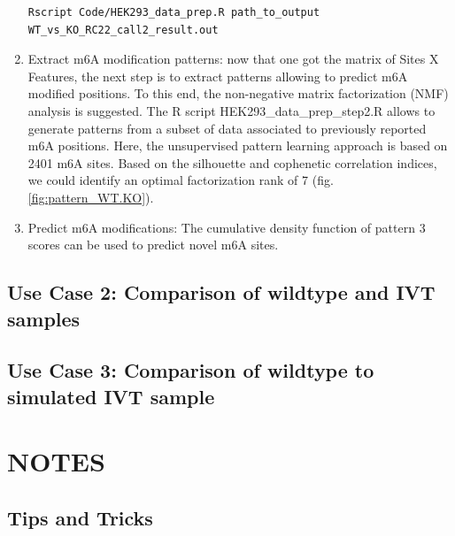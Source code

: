 \documentclass[times, 11pt, a4paper]{article}
\begin{document}
\begin{enumerate}
	\begin{verbatim} 
Rscript Code/HEK293_data_prep.R path_to_output WT_vs_KO_RC22_call2_result.out
\end{verbatim}
\item Extract m6A modification patterns: now that one got the matrix of Sites X Features, the next step is to extract patterns allowing to predict m6A modified positions. To this end, the non-negative matrix factorization (NMF) analysis is suggested. The R script HEK293\_data\_prep\_step2.R allows to generate patterns from a subset of data associated to previously reported m6A positions. Here, the unsupervised pattern learning approach is based on 2401 m6A sites. Based on the silhouette and cophenetic correlation indices, we could identify an optimal factorization rank of 7 (fig. \ref{fig:pattern_WT.KO}).
\item Predict m6A modifications: The cumulative density function of pattern 3 scores can be used to predict novel m6A sites.
	
\end{enumerate}
\subsection*{Use Case 2: Comparison of wildtype and IVT samples}
\subsection*{Use Case 3: Comparison of wildtype to simulated IVT sample}

\section*{NOTES}
\subsection*{Tips and Tricks}
\end{document}
